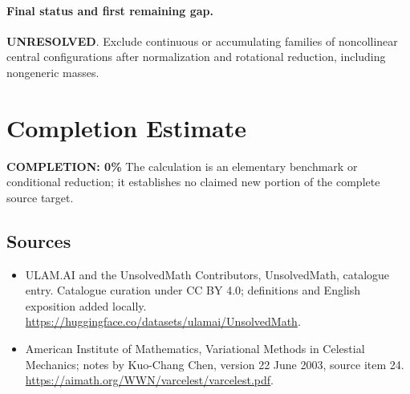 \documentclass[11pt]{article}
\begin{document}
\paragraph{Final status and first remaining gap.}
\textbf{UNRESOLVED}. Exclude continuous or accumulating families of noncollinear central configurations after normalization and rotational reduction, including nongeneric masses.

\section{Completion Estimate}
\noindent\textbf{COMPLETION: 0\%}
The calculation is an elementary benchmark or conditional reduction; it establishes no claimed new portion of the complete source target.

\subsection{Sources}
\begin{itemize}
\item[\hypertarget{source:statement:1}{S1}] ULAM.AI and the UnsolvedMath Contributors, UnsolvedMath, catalogue entry. Catalogue curation under CC BY 4.0; definitions and English exposition added locally.
\url{https://huggingface.co/datasets/ulamai/UnsolvedMath}.
\item[\hypertarget{source:statement:2}{S2}] American Institute of Mathematics, Variational Methods in Celestial Mechanics; notes by Kuo-Chang Chen, version 22 June 2003, source item 24.
\url{https://aimath.org/WWN/varcelest/varcelest.pdf}.
\end{itemize}
\label{end:statement}
\end{document}
